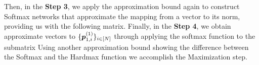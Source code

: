     Then, in the \textbf{Step 3}, we apply the approximation bound again to construct Softmax networks that approximate the mapping from a vector to its norm, providing us with the following matrix.
    Finally, in the \textbf{Step 4}, we obtain approximate vectors to $\{\boldsymbol{p}_{1,i}^{(1)}\}_{i\in[N]}$ through applying the softmax function to the submatrix
     Using another approximation bound showing the difference between the Softmax and the Hardmax function we accomplish the Maximization step.
